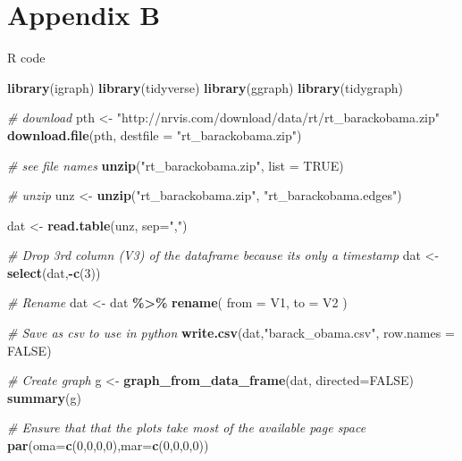 \documentclass[
]{article}
\newenvironment{Shaded}{\begin{snugshade}}{\end{snugshade}}
\newcommand{\CommentTok}[1]{\textcolor[rgb]{0.56,0.35,0.01}{\textit{#1}}}
\newcommand{\DataTypeTok}[1]{\textcolor[rgb]{0.13,0.29,0.53}{#1}}
\newcommand{\DecValTok}[1]{\textcolor[rgb]{0.00,0.00,0.81}{#1}}
\newcommand{\KeywordTok}[1]{\textcolor[rgb]{0.13,0.29,0.53}{\textbf{#1}}}
\newcommand{\NormalTok}[1]{#1}
\newcommand{\OperatorTok}[1]{\textcolor[rgb]{0.81,0.36,0.00}{\textbf{#1}}}
\newcommand{\OtherTok}[1]{\textcolor[rgb]{0.56,0.35,0.01}{#1}}
\newcommand{\StringTok}[1]{\textcolor[rgb]{0.31,0.60,0.02}{#1}}
\begin{document}
\pagebreak

\hypertarget{appendix-b}{%
\section{Appendix B}\label{appendix-b}}

R code

\begin{Shaded}
\begin{Highlighting}[]
\KeywordTok{library}\NormalTok{(igraph)}
\KeywordTok{library}\NormalTok{(tidyverse)}
\KeywordTok{library}\NormalTok{(ggraph)}
\KeywordTok{library}\NormalTok{(tidygraph)}

\CommentTok{\# download}
\NormalTok{pth <{-}}\StringTok{ "http://nrvis.com/download/data/rt/rt\_barackobama.zip"}
\KeywordTok{download.file}\NormalTok{(pth, }\DataTypeTok{destfile =} \StringTok{"rt\_barackobama.zip"}\NormalTok{)}

\CommentTok{\# see file names}
\KeywordTok{unzip}\NormalTok{(}\StringTok{"rt\_barackobama.zip"}\NormalTok{, }\DataTypeTok{list =} \OtherTok{TRUE}\NormalTok{)}

\CommentTok{\# unzip}
\NormalTok{unz <{-}}\StringTok{ }\KeywordTok{unzip}\NormalTok{(}\StringTok{"rt\_barackobama.zip"}\NormalTok{, }\StringTok{"rt\_barackobama.edges"}\NormalTok{)}

\NormalTok{dat <{-}}\StringTok{ }\KeywordTok{read.table}\NormalTok{(unz, }\DataTypeTok{sep=}\StringTok{","}\NormalTok{)}

\CommentTok{\# Drop 3rd column (V3) of the dataframe because it\textquotesingle{}s only a timestamp}
\NormalTok{dat <{-}}\StringTok{ }\KeywordTok{select}\NormalTok{(dat,}\OperatorTok{{-}}\KeywordTok{c}\NormalTok{(}\DecValTok{3}\NormalTok{))}

\CommentTok{\# Rename}
\NormalTok{dat <{-}}\StringTok{ }\NormalTok{dat }\OperatorTok{\%>\%}
\StringTok{  }\KeywordTok{rename}\NormalTok{(}
    \DataTypeTok{from =}\NormalTok{ V1,}
    \DataTypeTok{to =}\NormalTok{ V2}
\NormalTok{  )}

\CommentTok{\# Save as csv to use in python}
\KeywordTok{write.csv}\NormalTok{(dat,}\StringTok{"barack\_obama.csv"}\NormalTok{, }\DataTypeTok{row.names =} \OtherTok{FALSE}\NormalTok{)}

\CommentTok{\# Create graph}
\NormalTok{g <{-}}\StringTok{ }\KeywordTok{graph\_from\_data\_frame}\NormalTok{(dat, }\DataTypeTok{directed=}\OtherTok{FALSE}\NormalTok{)}
\KeywordTok{summary}\NormalTok{(g)}

\CommentTok{\# Ensure that that the plots take most of the available page space}
\KeywordTok{par}\NormalTok{(}\DataTypeTok{oma=}\KeywordTok{c}\NormalTok{(}\DecValTok{0}\NormalTok{,}\DecValTok{0}\NormalTok{,}\DecValTok{0}\NormalTok{,}\DecValTok{0}\NormalTok{),}\DataTypeTok{mar=}\KeywordTok{c}\NormalTok{(}\DecValTok{0}\NormalTok{,}\DecValTok{0}\NormalTok{,}\DecValTok{0}\NormalTok{,}\DecValTok{0}\NormalTok{))}


\end{Highlighting}
\end{Shaded}
\end{document}
